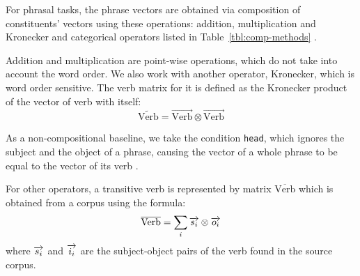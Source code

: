 For phrasal tasks, the phrase vectors are obtained via composition of constituents' vectors using these operations: addition, multiplication \cite{mitchell2010composition,mitchell-lapata:2008:ACLMain} and Kronecker \cite{Grefenstette:2011:ESC:2145432.2145580} and categorical operators listed in Table~\ref{tbl:comp-methods} \cite{milajevs-EtAl:2014:EMNLP2014,DBLP:journals/corr/abs-1003-4394}.

Addition and multiplication are point-wise operations, which do not take into account the word order. We also work with another operator, Kronecker, which is  word order sensitive. The verb matrix for it is defined as the Kronecker product of the vector of verb with itself:
%
\begin{equation*}
  \widetilde{\text{Verb}} = \overrightarrow{\text{Verb}} \otimes \overrightarrow{\text{Verb}}
\end{equation*}

As a non-compositional baseline, we take the condition \texttt{head}, which ignores the subject and the object of a phrase, causing the vector of a whole phrase to be equal to the vector of its verb \cite{milajevs-EtAl:2014:EMNLP2014}.

For other operators, a transitive verb is represented by matrix $\overline{\text{Verb}}$ which is obtained from a corpus using the formula:
$$
\overline{\text{Verb}} = \sum_i\overrightarrow{s_i} \otimes \overrightarrow{o_i}
$$
where $\overrightarrow{s_i}$ and $\overrightarrow{i_i}$ are the subject-object pairs of the verb found in the source corpus.


